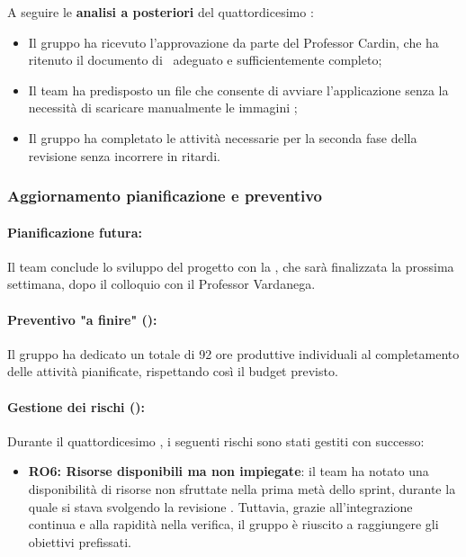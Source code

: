 \vspace{0.5\baselineskip}
\par A seguire le \textbf{analisi a posteriori} del quattordicesimo :
\begin{itemize}
  \item Il gruppo ha ricevuto l'approvazione da parte del Professor Cardin, che ha ritenuto il documento di \ST\ adeguato e sufficientemente completo;
  \item Il team ha predisposto un file che consente di avviare l'applicazione senza la necessità di scaricare manualmente le immagini ;
  \item Il gruppo ha completato le attività necessarie per la seconda fase della revisione  senza incorrere in ritardi.
\end{itemize}

\subsubsection{Aggiornamento pianificazione e preventivo}

\paragraph*{Pianificazione futura:}
\par Il team conclude lo sviluppo del progetto con la , che sarà finalizzata la prossima settimana, dopo il colloquio con il Professor Vardanega.

\paragraph*{Preventivo "a finire" ():}
\par Il gruppo ha dedicato un totale di 92 ore produttive individuali al completamento delle attività pianificate, rispettando così il budget previsto.

\paragraph*{Gestione dei rischi ():}
\par Durante il quattordicesimo , i seguenti rischi sono stati gestiti con successo:
\begin{itemize}
  \item \textbf{RO6: Risorse disponibili ma non impiegate}: il team ha notato una disponibilità di risorse non sfruttate nella prima metà dello sprint, durante la quale si stava svolgendo la revisione . Tuttavia, grazie all'integrazione continua e alla rapidità nella verifica, il gruppo è riuscito a raggiungere gli obiettivi prefissati.
\end{itemize}
